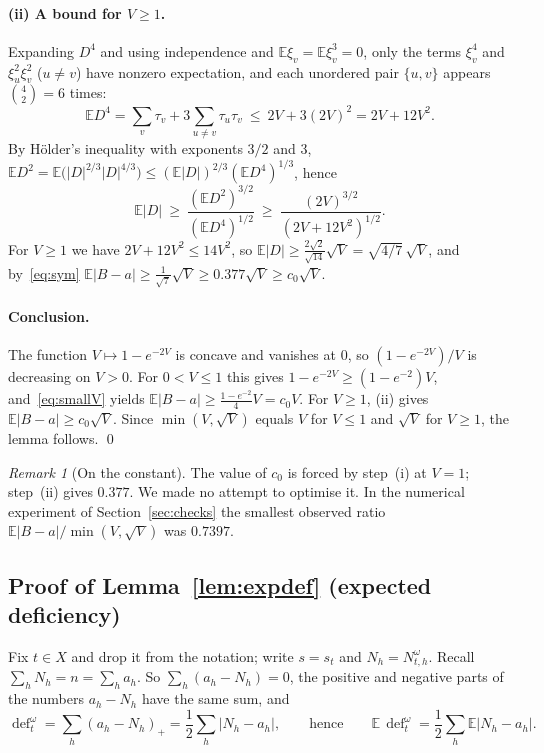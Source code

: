 \documentclass[11pt,a4paper]{article}
\theoremstyle{definition}
\theoremstyle{remark}
\newtheorem{remark}[theorem]{Remark}
\newcommand{\E}{\mathbb{E}}
\newcommand{\dfc}{\operatorname{def}}
\begin{document}
\paragraph{(ii) A bound for $V\ge1$.} Expanding $D^4$ and using independence and
$\E\xi_v=\E\xi_v^3=0$, only the terms $\xi_v^4$ and $\xi_u^2\xi_v^2$ ($u\ne v$) have nonzero
expectation, and each unordered pair $\{u,v\}$ appears $\binom42=6$ times:
\[
\E D^4=\sum_v\tau_v+3\sum_{u\ne v}\tau_u\tau_v\ \le\ 2V+3(2V)^2=2V+12V^2 .
\]
By H\"older's inequality with exponents $3/2$ and $3$,
$\E D^2=\E\bigl(|D|^{2/3}|D|^{4/3}\bigr)\le(\E|D|)^{2/3}(\E D^4)^{1/3}$, hence
\[
\E|D|\ \ge\ \frac{(\E D^2)^{3/2}}{(\E D^4)^{1/2}}\ \ge\ \frac{(2V)^{3/2}}{(2V+12V^2)^{1/2}} .
\]
For $V\ge1$ we have $2V+12V^2\le14V^2$, so $\E|D|\ge\frac{2\sqrt2}{\sqrt{14}}\sqrt V
=\sqrt{4/7}\,\sqrt V$, and by~\eqref{eq:sym}
$\E|B-a|\ge\frac{1}{\sqrt7}\sqrt V\ge0.377\sqrt V\ge c_0\sqrt V$.

\paragraph{Conclusion.} The function $V\mapsto1-e^{-2V}$ is concave and vanishes at $0$, so
$(1-e^{-2V})/V$ is decreasing on $V>0$. For $0<V\le1$ this gives
$1-e^{-2V}\ge(1-e^{-2})V$, and~\eqref{eq:smallV} yields
$\E|B-a|\ge\frac{1-e^{-2}}{4}V=c_0V$. For $V\ge1$, (ii) gives $\E|B-a|\ge c_0\sqrt V$. Since
$\min(V,\sqrt V)$ equals $V$ for $V\le1$ and $\sqrt V$ for $V\ge1$, the lemma follows. \qed

\begin{remark}[On the constant]\label{rem:const}
The value of $c_0$ is forced by step~(i) at $V=1$; step~(ii) gives $0.377$. We made no
attempt to optimise it. In the numerical experiment of Section~\ref{sec:checks} the smallest
observed ratio $\E|B-a|/\min(V,\sqrt V)$ was $0.7397$.
\end{remark}

\subsection{Proof of Lemma~\ref{lem:expdef} (expected deficiency)}

Fix $t\in X$ and drop it from the notation; write $s=s_t$ and $N_h=N^\omega_{t,h}$. Recall
$\sum_hN_h=n=\sum_ha_h$. So $\sum_h(a_h-N_h)=0$, the positive and negative parts of the
numbers $a_h-N_h$ have the same sum, and
\[
\dfc^\omega_t=\sum_h(a_h-N_h)_+=\frac12\sum_h|N_h-a_h|,\qquad\text{hence}\qquad
\E\,\dfc^\omega_t=\frac12\sum_h\E|N_h-a_h| .
\]
\end{document}
